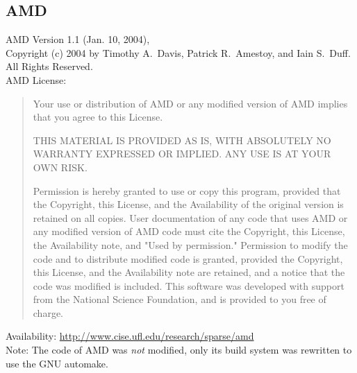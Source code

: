 \documentclass[10pt,a4paper]{ddedoc}
\begin{document}
\subsection{AMD}

\noindent
AMD Version 1.1 (Jan. 10, 2004), \\
Copyright (c) 2004 by Timothy A.~Davis, Patrick R.~Amestoy, and Iain S.~Duff. All Rights Reserved. \\[0.5em]
AMD License:
\begin{quote}
Your use or distribution of AMD or any modified version of
AMD implies that you agree to this License.

THIS MATERIAL IS PROVIDED AS IS, WITH ABSOLUTELY NO WARRANTY
EXPRESSED OR IMPLIED.  ANY USE IS AT YOUR OWN RISK.

Permission is hereby granted to use or copy this program, provided
that the Copyright, this License, and the Availability of the original
version is retained on all copies.  User documentation of any code that
uses AMD or any modified version of AMD code must cite the
Copyright, this License, the Availability note, and "Used by permission."
Permission to modify the code and to distribute modified code is granted,
provided the Copyright, this License, and the Availability note are
retained, and a notice that the code was modified is included.  This
software was developed with support from the National Science Foundation,
and is provided to you free of charge.
\end{quote}
\noindent
Availability: \url{http://www.cise.ufl.edu/research/sparse/amd}\\[0.5em]
Note: The code of AMD was \emph{not} modified, only its build system was rewritten to use 
the GNU automake.


 \label{sec:bibliography}
\end{document}
